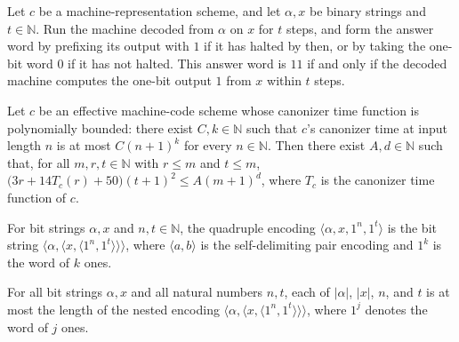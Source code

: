 \begin{lemma}
\label{Complexity.tmsatAnswer_accept}
\leanok
{}
Let $c$ be a machine-representation scheme, and let $\alpha,x$ be binary strings and
$t\in\mathbb{N}$. Run the machine decoded from $\alpha$ on $x$ for $t$ steps, and form
the answer word by prefixing its output with $1$ if it has halted by then, or by taking
the one-bit word $0$ if it has not halted. This answer word is $11$ if and only if the
decoded machine computes the one-bit output $1$ from $x$ within $t$ steps.
\end{lemma}

\begin{lemma}
\label{Complexity.tmsat_simulation_budget}
\leanok
{}
Let $c$ be an effective machine-code scheme whose canonizer time function is
polynomially bounded: there exist $C,k\in\mathbb{N}$ such that $c$'s canonizer time at
input length $n$ is at most $C(n+1)^k$ for every $n\in\mathbb{N}$. Then there exist
$A,d\in\mathbb{N}$ such that, for all $m,r,t\in\mathbb{N}$ with $r\le m$ and $t\le m$,
$\bigl(3r+14T_c(r)+50\bigr)(t+1)^2\le A(m+1)^d$, where $T_c$ is the canonizer time
function of $c$.
\end{lemma}

\begin{definition}
\label{Complexity.tmsatQuad}
\leanok
{}
For bit strings $\alpha, x$ and $n, t \in \mathbb{N}$, the quadruple encoding $\langle\alpha, x, 1^n, 1^t\rangle$ is the bit string $\langle\alpha,\langle x,\langle 1^n,1^t\rangle\rangle\rangle$, where $\langle a,b\rangle$ is the self-delimiting pair encoding and $1^k$ is the word of $k$ ones.
\end{definition}

\begin{lemma}
\label{Complexity.tmsat_quad_bounds}
\leanok
{}
For all bit strings $\alpha,x$ and all natural numbers $n,t$, each of $|\alpha|$, $|x|$,
$n$, and $t$ is at most the length of the nested encoding $\langle\alpha,\langle
x,\langle 1^n,1^t\rangle\rangle\rangle$, where $1^j$ denotes the word of $j$ ones.
\end{lemma}

